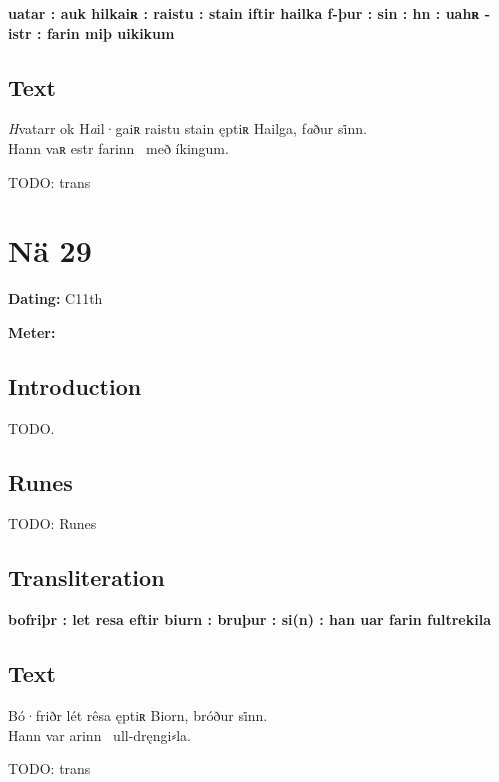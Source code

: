 \textbf{uatar : auk hilkaiʀ : raistu : stain iftir hailka f-þur : sin : hn : uahʀ -istr : farin miþ uikikum}

\subsection{Text}

\bpg\bpa[0]%
\startsub \emph{H}vatarr ok H\emph{a}il·gaiʀ raistu stain ęptiʀ Hailga, f\emph{a}ður si̇nn.\endsub \\
Hann vaʀ \emph{}estr farinn \hld\ með íkingum.\epa

\bpb TODO: trans\epb\epg

\sectionline\clearpage


\section{Nä 29}

\begin{flushright}%
\textbf{Dating:} C11th

\textbf{Meter:} \Fornyrdislag
\end{flushright}%

\subsection{Introduction}

TODO.

\subsection{Runes}

TODO: Runes%

\subsection{Transliteration}

\textbf{bofriþr : let resa eftir biurn : bruþur : si(n) : han uar farin fultrekila}

\subsection{Text}

\bpg\bpa[0]%
Bó·friðr lét rêsa ęptiʀ Biorn, bróður si̇nn. \\
Hann var arinn \hld\ ull-dręngi⸗la.\epa

\bpb TODO: trans\epb\epg

